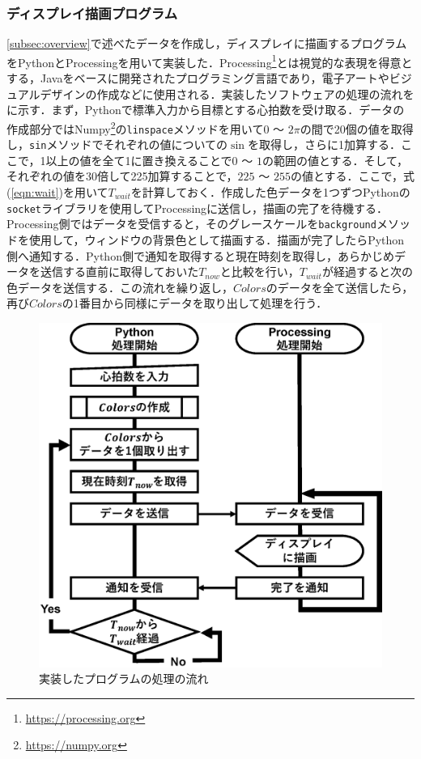 \documentclass[Japanese,noauthor]{dicomopapers}
\begin{document}
\subsubsection{ディスプレイ描画プログラム}
\ref{subsec:overview}で述べたデータを作成し，ディスプレイに描画するプログラムをPythonとProcessingを用いて実装した．Processing\footnote{\url{https://processing.org}}とは視覚的な表現を得意とする，Javaをベースに開発されたプログラミング言語であり，電子アートやビジュアルデザインの作成などに使用される．実装したソフトウェアの処理の流れをに示す．まず，Pythonで標準入力から目標とする心拍数を受け取る．データの作成部分ではNumpy\footnote{\url{https://numpy.org}}の\texttt{linspace}メソッドを用いて$0$ ～ $2\pi$の間で20個の値を取得し，\texttt{sin}メソッドでそれぞれの値についての$\sin$を取得し，さらに1加算する．ここで，1以上の値を全て1に置き換えることで$0$ ～ $1$の範囲の値とする．そして，それぞれの値を30倍して225加算することで，$225$ ～ $255$の値とする．ここで，式(\ref{eqn:wait})を用いて$T_{wait}$を計算しておく．作成した色データを1つずつPythonの\texttt{socket}ライブラリを使用してProcessingに送信し，描画の完了を待機する．Processing側ではデータを受信すると，そのグレースケールを\texttt{background}メソッドを使用して，ウィンドウの背景色として描画する．描画が完了したらPython側へ通知する．Python側で通知を取得すると現在時刻を取得し，あらかじめデータを送信する直前に取得しておいた$T_{now}$と比較を行い，$T_{wait}$が経過すると次の色データを送信する．この流れを繰り返し，$Colors$のデータを全て送信したら，再び$Colors$の1番目から同様にデータを取り出して処理を行う．

\begin{figure}[!t]
  \begin{center}
    \includegraphics[width=1\linewidth]{figures/software.eps}
  \end{center}
  \caption{実装したプログラムの処理の流れ}
  \label{fig:software}
\end{figure}
\end{document}
